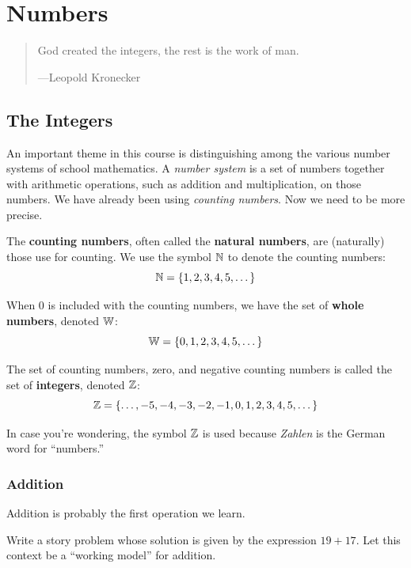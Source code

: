 \chapter{Numbers}

\begin{quote}
God created the integers, the rest is the work of man.

\hfill---Leopold Kronecker 
\end{quote}

\section{The Integers}
An important theme in this course is distinguishing among the various number systems of school mathematics.  A \emph{number system} is a set of numbers together with arithmetic operations, such as addition and multiplication, on those numbers.  We have already been using \textit{counting numbers}.  Now we need to be more precise.  

\begin{definition}
The \textbf{counting numbers}, often called the \textbf{natural numbers}, are (naturally) those use for counting.  We use the symbol $\mathbb N$ to denote the counting numbers:  
\[
\mathbb N = \{1, 2, 3, 4, 5, \dots\}
\]

When $0$ is included with the counting numbers, we have the set of \textbf{whole numbers}, denoted $\mathbb W$:  
\[
\mathbb W = \{0, 1, 2, 3, 4, 5, \dots\}
\]

The set of counting numbers, zero, and negative counting numbers is called
the set of \textbf{integers}, denoted $\mathbb Z$:
\[
\mathbb Z = \{\dots, -5,-4,-3,-2,-1,0,1,2,3,4,5,\dots \}
\]
\end{definition}

In case you're wondering, the symbol $\mathbb Z$ is used because
\textit{Zahlen} is the German word for ``numbers.'' 

\subsection{Addition}

Addition is probably the first operation we learn.    

\begin{question}
Write a story problem whose solution is given by the expression
$19+17$. Let this context be a ``working model'' for addition.
\end{question}
\QM

